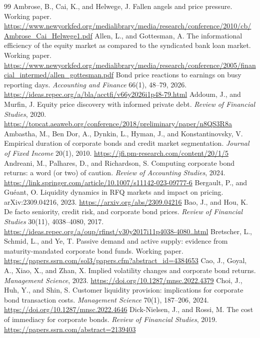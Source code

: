 \documentclass[11pt,letterpaper]{article}
\begin{document}
\begin{thebibliography}{99}
\small
{} Ambrose, B., Cai, K., and Helwege, J. Fallen angels and price pressure. Working paper. \url{https://www.newyorkfed.org/medialibrary/media/research/conference/2010/cb/Ambrose_Cai_Helwege1.pdf}
 Allen, L., and Gottesman, A. The informational efficiency of the equity market as compared to the syndicated bank loan market. Working paper. \url{https://www.newyorkfed.org/medialibrary/media/research/conference/2005/financial_intermed/allen_gottesman.pdf}
 Bond price reactions to earnings on busy reporting days. \emph{Accounting and Finance} 66(1), 48--79, 2026. \url{https://ideas.repec.org/a/bla/acctfi/v66y2026i1p48-79.html}
 Addoum, J., and Murfin, J. Equity price discovery with informed private debt. \emph{Review of Financial Studies}, 2020. \url{https://topcat.aeaweb.org/conference/2018/preliminary/paper/n8QS3R8a}
 Ambastha, M., Ben Dor, A., Dynkin, L., Hyman, J., and Konstantinovsky, V. Empirical duration of corporate bonds and credit market segmentation. \emph{Journal of Fixed Income} 20(1), 2010. \url{https://jfi.pm-research.com/content/20/1/5}
 Andreani, M., Palhares, D., and Richardson, S. Computing corporate bond returns: a word (or two) of caution. \emph{Review of Accounting Studies}, 2024. \url{https://link.springer.com/article/10.1007/s11142-023-09777-6}
 Bergault, P., and Gu\'eant, O. Liquidity dynamics in RFQ markets and impact on pricing. arXiv:2309.04216, 2023. \url{https://arxiv.org/abs/2309.04216}
 Bao, J., and Hou, K. De facto seniority, credit risk, and corporate bond prices. \emph{Review of Financial Studies} 30(11), 4038--4080, 2017. \url{https://ideas.repec.org/a/oup/rfinst/v30y2017i11p4038-4080..html}
 Bretscher, L., Schmid, L., and Ye, T. Passive demand and active supply: evidence from maturity-mandated corporate bond funds. Working paper. \url{https://papers.ssrn.com/sol3/papers.cfm?abstract_id=4384653}
 Cao, J., Goyal, A., Xiao, X., and Zhan, X. Implied volatility changes and corporate bond returns. \emph{Management Science}, 2023. \url{https://doi.org/10.1287/mnsc.2022.4379}
 Choi, J., Huh, Y., and Shin, S. Customer liquidity provision: implications for corporate bond transaction costs. \emph{Management Science} 70(1), 187--206, 2024. \url{https://doi.org/10.1287/mnsc.2022.4646}
 Dick-Nielsen, J., and Rossi, M. The cost of immediacy for corporate bonds. \emph{Review of Financial Studies}, 2019. \url{https://papers.ssrn.com/abstract=2139403}

\end{thebibliography}
\end{document}
